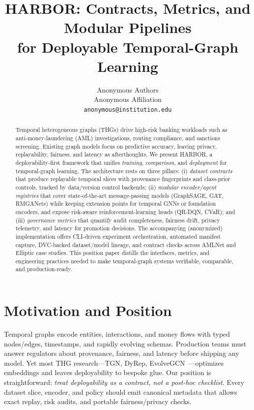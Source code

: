 \documentclass[letterpaper]{article}
\title{HARBOR: Contracts, Metrics, and Modular Pipelines\\for Deployable Temporal-Graph Learning}
\author{
Anonymous Authors\\
Anonymous Affiliation\\
\texttt{anonymous@institution.edu}
}
\begin{document}
\maketitle

\begin{abstract}
Temporal heterogeneous graphs (THGs) drive high-risk banking workloads such as anti-money-laundering (AML) investigations, routing compliance, and sanctions screening. Existing graph models focus on predictive accuracy, leaving privacy, replayability, fairness, and latency as afterthoughts. We present \textsc{HARBOR}, a deployability-first framework that unifies \emph{training}, \emph{comparison}, and \emph{deployment} for temporal-graph learning. The architecture rests on three pillars: (i) \emph{dataset contracts} that produce replayable temporal slices with provenance fingerprints and class-prior controls, tracked by data/version control backends; (ii) \emph{modular encoder/agent registries} that cover state-of-the-art message-passing models (GraphSAGE, GAT, RMGANets) while keeping extension points for temporal GNNs or foundation encoders, and expose risk-aware reinforcement-learning heads (QR-DQN, CVaR); and (iii) \emph{governance metrics} that quantify audit completeness, fairness drift, privacy telemetry, and latency for promotion decisions. The accompanying (anonymized) implementation offers CLI-driven experiment orchestration, automated manifest capture, DVC-backed dataset/model lineage, and contract checks across AMLNet and Elliptic case studies. This position paper distills the interfaces, metrics, and engineering practices needed to make temporal-graph systems verifiable, comparable, and production-ready.
\end{abstract}

\section{Motivation and Position}
\label{sec:intro}
Temporal graphs encode entities, interactions, and money flows with typed nodes/edges, timestamps, and rapidly evolving schemas. Production teams must answer regulators about provenance, fairness, and latency before shipping any model. Yet most THG research---TGN, DyRep, EvolveGCN~\citep{rossi2020tgn,trivedi2019dyrep,pareja2020evolvegcn}---optimizes embeddings and leaves deployability to bespoke glue. Our position is straightforward: \emph{treat deployability as a contract, not a post-hoc checklist}. Every dataset slice, encoder, and policy should emit canonical metadata that allows exact replay, risk audits, and portable fairness/privacy checks.
\end{document}
